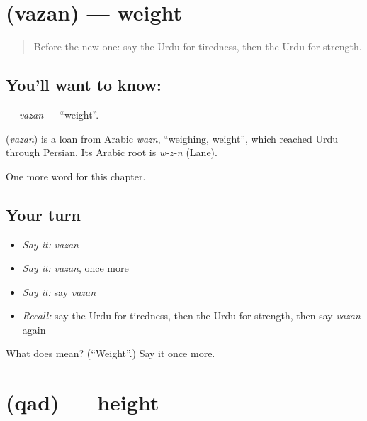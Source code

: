 \section[\texorpdfstring{\ur{وزن} (vazan)}{وزن (vazan)}]{ (vazan) — weight}

\label{lesson:UR-C243-vazan}



\begin{quote}
Before the new one: say the Urdu for tiredness, then the Urdu for strength.
\end{quote}

\subsection*{You'll want to know: }
\textbf{} — \emph{vazan} — \textquotedblleft{}weight\textquotedblright{}.

\begin{cousinweb}
\textbf{} (\emph{vazan}) is a loan from Arabic \emph{wazn}, \textquotedblleft{}weighing, weight\textquotedblright{}, which reached Urdu through Persian. Its Arabic root is \emph{w-z-n} (Lane).
\end{cousinweb}

\begin{grammarlens}[title={What you've built}]
One more word for this chapter.
\end{grammarlens}

\subsection*{Your turn}
\begin{itemize}
\raggedright
  \item \emph{Say it:} \emph{vazan}
  \item \emph{Say it:} \emph{vazan}, once more
  \item \emph{Say it:} say \emph{vazan}
  \item \emph{Recall:} say the Urdu for tiredness, then the Urdu for strength, then say \emph{vazan} again
\end{itemize}

\begin{tcolorbox}[breakable,colback=teal!4,colframe=teal!35!black,title={Before you move on}]
What does  mean? (\textquotedblleft{}Weight\textquotedblright{}.) Say it once more.
\end{tcolorbox}
\section[\texorpdfstring{\ur{قد} (qad)}{قد (qad)}]{ (qad) — height}

